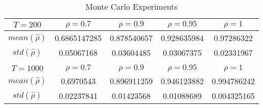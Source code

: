 \documentclass[12pt]{article}
\begin{document}
\begin{table} [ht]
\centering

\caption{Monte Carlo Experiments} 

\begin{tabular}{c c c c c}

\toprule
$T=200$ & $\rho=0.7$ & $\rho=0.9$ & $\rho=0.95$ & $\rho=1$\\
\midrule
$mean(\hat{\rho})$ &0.6865147285 &0.878540657 & 0.928635984& 0.97286322 \\
$std(\hat{\rho})$ &0.05067168 &0.03604485 & 0.03067375& 0.02331967 \\

\\

$T=1000$ & $\rho=0.7$ & $\rho=0.9$ & $\rho=0.95$ & $\rho=1$\\
\midrule
$mean(\hat{\rho})$&0.6970543 & 0.896911259 &0.946123882 &0.994786242 \\
$std(\hat{\rho})$ &0.02237841 &0.01423568 &0.01088689&0.004325165\\
\bottomrule

\end{tabular}

\end{table}
\end{document}
